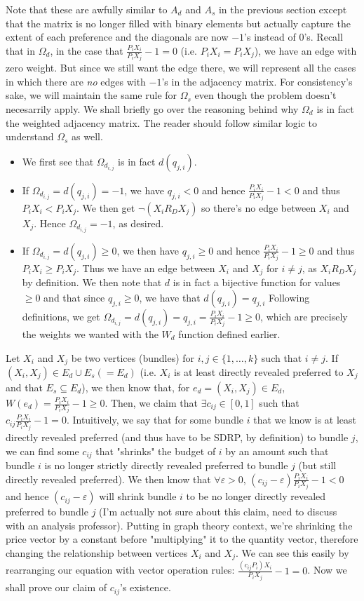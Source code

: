 \documentclass{article} %
\begin{document}
Note that these are awfully similar to $A_d$ and $A_s$ in the previous section except that the matrix is no longer filled with binary elements but actually capture the extent of each preference and the diagonals are now $-1$'s instead of $0$'s. Recall that in $\Omega_d$, in the case that $\frac{P_iX_i}{P_iX_j}-1=0$ (i.e. $P_iX_i=P_iX_j$), we have an edge with zero weight. But since we still want the edge there, we will represent all the cases in which there are \textit{no} edges with $-1$'s in the adjacency matrix. For consistency's sake, we will maintain the same rule for $\Omega_s$ even though the problem doesn't necesarrily apply. We shall briefly go over the reasoning behind why $\Omega_d$ is in fact the weighted adjacency matrix. The reader should follow similar logic to understand $\Omega_s$ as well.
\begin{itemize}
  \item We first see that $\Omega_{d_{i,j}}$ is in fact $d(q_{j,i})$.
  \item If $\Omega_{d_{i,j}}=d(q_{j,i})=-1$, we have $q_{j,i}<0$ and hence $\frac{P_iX_i}{P_iX_j}-1<0$ and thus $P_iX_i<P_iX_j$. We then get $\neg(X_i R_D X_j)$ so there's no edge between $X_i$ and $X_j$. Hence $\Omega_{d_{i,j}}=-1$, as desired.
  \item If $\Omega_{d_{i,j}}=d(q_{j,i})\geq0$, we then have $q_{j,i}\geq0$ and hence $\frac{P_iX_i}{P_iX_j}-1\geq0$ and thus $P_iX_i\geq P_iX_j$. Thus we have an edge between $X_i$ and $X_j$ for $i\not=j$, as $X_iR_D X_j$ by definition. We then note that $d$ is in fact a bijective function for values $\geq0$ and that since $q_{j,i}\geq0$, we have that $d(q_{j,i})=q_{j,i}$ Following definitions, we get $\Omega_{d_{i,j}}=d(q_{j,i})=q_{j,i}=\frac{P_iX_i}{P_iX_j}-1\geq0$, which are precisely the weights we wanted with the $W_d$ function defined earlier.
\end{itemize}
Let $X_i$ and $X_j$ be two vertices (bundles) for $i,j\in\{1,\ldots,k\}$ such that $i\not=j$. If $(X_i, X_j)\in E_d \cup E_s (=E_d)$ (i.e. $X_i$ is at least directly revealed preferred to $X_j$ and that $E_s\subseteq E_d$), we then know that, for $e_d=(X_i, X_j)\in E_d$, $W(e_d)=\frac{P_iX_i}{P_iX_j}-1\geq0$. Then, we claim that $\exists c_{ij}\in[0,1]$ such that $c_{ij}\frac{P_iX_i}{P_iX_j}-1=0$. Intuitively, we say that for some bundle $i$ that we know is at least directly revealed preferred (and thus have to be SDRP, by definition) to bundle $j$, we can find some $c_{ij}$ that "shrinks" the budget of $i$ by an amount such that bundle $i$ is no longer strictly directly revealed preferred to bundle $j$ (but still directly revealed preferred). We then know that $\forall\varepsilon>0$, $(c_{ij}-\varepsilon)\frac{P_iX_i}{P_iX_j}-1<0$ and hence $(c_{ij}-\varepsilon)$ will shrink bundle $i$ to be no longer directly revealed preferred to bundle $j$ (I'm actually not sure about this claim, need to discuss with an analysis professor). Putting in graph theory context, we're shrinking the price vector by a constant before "multiplying" it to the quantity vector, therefore changing the relationship between vertices $X_i$ and $X_j$. We can see this easily by rearranging our equation with vector operation rules: $\frac{(c_{ij}P_i)X_i}{P_iX_j}-1=0$. Now we shall prove our claim of $c_{ij}$'s existence.
\end{document}
